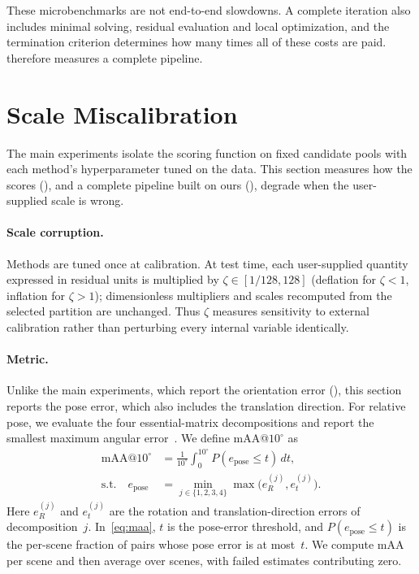 These microbenchmarks are not end-to-end slowdowns.  A complete
\ransac iteration also includes minimal solving, residual evaluation
and local optimization, and the termination criterion determines how
many times all of these costs are paid.  
therefore measures a complete pipeline.

\section{Scale Miscalibration}
\label{sec:supp-miscal}

The main experiments isolate the scoring function on fixed candidate
pools with each method's hyperparameter tuned on the data. This section
measures how the scores (), and a complete \ransac
pipeline built on ours (), degrade when the
user-supplied scale is wrong.

\paragraph{Scale corruption.}
Methods are tuned once at calibration. At test time, each user-supplied
quantity expressed in residual units is multiplied by
$\zeta\in[1/128,128]$ (deflation for $\zeta<1$, inflation for $\zeta>1$);
dimensionless multipliers and scales recomputed from the selected partition
are unchanged. Thus $\zeta$ measures sensitivity to external calibration
rather than perturbing every internal variable identically.

\paragraph{Metric.}
Unlike the main experiments, which report the orientation error
(), this section reports the pose error, which also
includes the translation direction. For relative pose, we evaluate the four
essential-matrix decompositions and report the smallest maximum angular
error~\cite{Jin2021}. We define
mAA@$10^\circ$ as
\begin{equation}
	\begin{aligned}
		\mathrm{mAA}@10^\circ
		 & =\frac{1}{10^\circ}\int_0^{10^\circ}
		P(e_{\mathrm{pose}}\le t)\,dt,                                 \\
		\text{s.t.}\quad e_{\mathrm{pose}}
		 & =\min_{j\in\{1,2,3,4\}}\max\bigl(e_R^{(j)},e_t^{(j)}\bigr).
	\end{aligned}
	\label{eq:maa}
\end{equation}
Here $e_R^{(j)}$ and $e_t^{(j)}$ are the rotation and
translation-direction errors of decomposition~$j$. In~\eqref{eq:maa},
$t$ is the pose-error threshold, and $P(e_{\mathrm{pose}}\le t)$ is the
per-scene fraction of pairs whose pose error is at most~$t$. We compute
mAA per scene and then average over scenes, with failed estimates
contributing zero.


